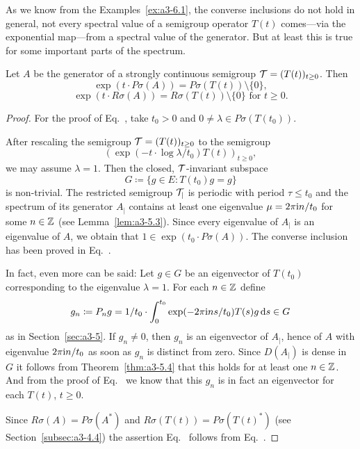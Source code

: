 As we know from the Examples~\ref{ex:a3-6.1}, the converse inclusions do not hold in general, \ie not every spectral value of a semigroup operator $T(t)$ comes---via the exponential map---from a spectral value of the generator.
But at least this is true for some important parts of the spectrum.
\begin{theorem}\label{thm:a3-6.3}%
Let $A$ be the generator of a strongly continuous semigroup $\TT = (T(t))_{t \geq 0}$.
Then
\begin{equation}\label{eq:a3-6.4}
\exp(t \cdot P\sigma(A)) = P\sigma(T(t)) \setminus \{0\} ,
\end{equation}
\begin{equation}\label{eq:a3-6.5}
\exp(t \cdot R\sigma(A)) = R\sigma(T(t)) \setminus \{0\} \text{ for } t \geq 0 .
\end{equation}
\end{theorem}
\begin{proof}
For the proof of Eq.~,  take $t_{0} > 0$ and $0 \neq \lambda \in P\sigma(T(t_{0}))$.

After rescaling the semigroup $\TT = (T(t))_{t \geq 0}$ to the semigroup
\[
(\exp(-t \cdot \log\lambda/t_{0})T(t))_{t \geq 0} ,
\]
we may assume $\lambda = 1$. 
Then the closed, $\mathcal{T}$-invariant subspace
\[
G \coloneq \{g \in E \colon T(t_{0})g = g\}
\]
is non-trivial.
The restricted semigroup $\mathcal{T}_{|}$ is periodic with period $\tau \leq t_{0}$ and the spectrum of its generator $A_{|}$ contains at least one eigenvalue $\mu = 2\pi\mathrm{i} n/t_{0}$ for some $n \in \mathbb{Z}$ (see Lemma~\ref{lem:a3-5.3}).
Since every eigenvalue of\/ $A_{|}$ is an eigenvalue of\/ $A$, we obtain that $1 \in \exp(t_{0} \cdot P\sigma(A))$.
The converse inclusion has been proved in Eq.~.

In fact, even more can be said: Let $g \in G$ be an eigenvector of\/ $T(t_{0})$ corresponding to the eigenvalue $\lambda = 1$.
For each $n \in \mathbb{Z}$ define
\[
g_{n} \coloneq P_{n}g = 1/t_{0} \cdot \int_{0}^{t_{0}} \exp(-2\pi\mathrm{i} ns/t_{0})T(s)g  \mathop{}\!\mathrm{d}{s} \in G
\]
as in Section~\ref{sec:a3-5}.
If\/ $g_{n} \ne 0$, then $g_{n}$ is an eigenvector of\/ $A_{|}$, hence of\/ $A$ with eigenvalue $2\pi\mathrm{i} n/t_{0}$ as soon as $g_{n}$ is distinct from zero.
Since $D(A_{|})$ is dense in $G$ it follows from Theorem~\ref{thm:a3-5.4} that this holds for at least one $n \in \mathbb{Z}$.
And from the proof of Eq.~ we know that this $g_{n}$ is in fact an eigenvector for each $T(t)$, $t \geq 0$.

Since $R\sigma(A) = P\sigma(A^{*})$ and $R\sigma(T(t)) = P\sigma(T(t)^{*})$ (see Section~\ref{subsec:a3-4.4}) the assertion Eq.~  follows from Eq.~.
\end{proof}
